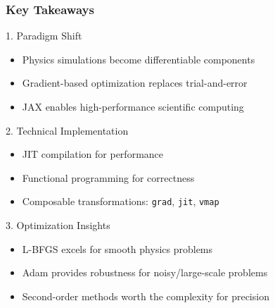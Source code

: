 \documentclass[notes]{beamer}
\begin{document}
\begin{frame}
\frametitle{Key Takeaways}

\begin{block}{1. Paradigm Shift}
\begin{itemize}
    \item Physics simulations become differentiable components
    \item Gradient-based optimization replaces trial-and-error
    \item JAX enables high-performance scientific computing
\end{itemize}
\end{block}

\begin{block}{2. Technical Implementation}
\begin{itemize}
    \item JIT compilation for performance
    \item Functional programming for correctness
    \item Composable transformations: \texttt{grad}, \texttt{jit}, \texttt{vmap}
\end{itemize}
\end{block}

\begin{block}{3. Optimization Insights}
\begin{itemize}
    \item L-BFGS excels for smooth physics problems
    \item Adam provides robustness for noisy/large-scale problems
    \item Second-order methods worth the complexity for precision
\end{itemize}
\end{block}

\end{frame}
\end{document}
